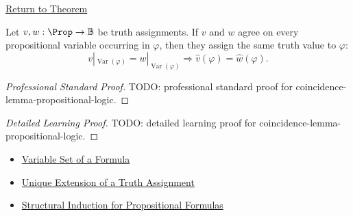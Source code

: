 \newpage
{}
\label{prf:coincidence-lemma-propositional-logic}

\begin{remark*}[Return]
\hyperref[lem:coincidence-lemma-propositional-logic]{Return to Theorem}
\end{remark*}

\begin{theorem*}
Let \(v,w:\Prop\to\mathbb{B}\) be truth assignments. If \(v\) and \(w\) agree on every propositional variable occurring in \(\varphi\), then they assign the same truth value to \(\varphi\):
\[
v|_{\operatorname{Var}(\varphi)}
=
w|_{\operatorname{Var}(\varphi)}
\Longrightarrow
\widehat v(\varphi)=\widehat w(\varphi).
\]
\end{theorem*}

\begin{proof}[Professional Standard Proof]
\LRAProofBodyStart
TODO: professional standard proof for coincidence-lemma-propositional-logic.
\end{proof}

\begin{proof}[Detailed Learning Proof]
\LRAProofBodyStart
TODO: detailed learning proof for coincidence-lemma-propositional-logic.
\end{proof}

\begin{remark*}
\end{remark*}

\begin{dependencies}
\begin{itemize}
  \item \hyperref[def:formula-variable-set-propositional-logic]{Variable Set of a Formula}
  \item \hyperref[thm:unique-extension-truth-assignment-propositional-logic]{Unique Extension of a Truth Assignment}
  \item \hyperref[thm:structural-induction-propositional-formulas]{Structural Induction for Propositional Formulas}
\end{itemize}
\end{dependencies}

\clearpage
